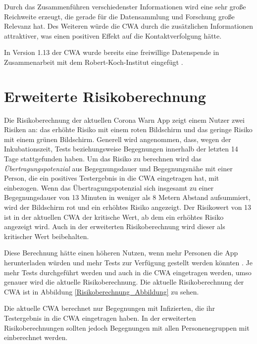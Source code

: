 \documentclass[conference,compsoc]{IEEEtran}
\begin{document}
Durch das Zusammenführen verschiedenster Informationen wird eine sehr große Reichweite erzeugt, die gerade für die Datensammlung und Forschung große Relevanz hat.
Des Weiteren würde die CWA durch die zusätzlichen Informationen attraktiver, was einen positiven Effekt auf die Kontaktverfolgung hätte.

In Version 1.13 der CWA wurde bereits eine freiwillige Datenspende in Zusammenarbeit mit dem Robert-Koch-Institut eingefügt \cite{freiwilligeDatenspende}. 

\section{Erweiterte Risikoberechnung} \label{Erweiterte_Risikoberechnung}

Die Risikoberechnung der aktuellen Corona Warn App zeigt einem Nutzer zwei Risiken an: 
das erhöhte Risiko mit einem roten Bildschirm und das geringe Risiko mit einem grünen Bildschirm. 
Generell wird angenommen, dass, wegen der Inkubationszeit, Tests beziehungsweise Begegnungen innerhalb der letzten 14 Tage stattgefunden haben.
Um das Risiko zu berechnen wird das \textit{Übertragungspotenzial} aus Begegnungsdauer und Begegnungsnähe mit einer Person, 
die ein positives Testergebnis in die CWA eingetragen hat, mit einbezogen. 
Wenn das Übertragungspotenzial sich insgesamt zu einer Begegnungsdauer von 13 Minuten in weniger als 8 Metern Abstand aufsummiert, 
wird der Bildschirm rot und ein erhöhtes Risiko angezeigt.
Der Risikowert von 13 ist in der aktuellen CWA der kritische Wert, ab dem ein erhöhtes Risiko angezeigt wird.
Auch in der erweiterten Risikoberechnung wird dieser als kritischer Wert beibehalten.

Diese Berechnung hätte einen höheren Nutzen, wenn mehr Personen die App herunterladen würden und mehr Tests zur Verfügung gestellt werden könnten \cite{EffectivenessCWA}.
Je mehr Tests durchgeführt werden und auch in die CWA eingetragen werden, umso genauer wird die aktuelle Risikoberechnung. 
Die aktuelle Risikoberechnung der CWA ist in Abbildung \ref{Risikoberechnung_Abbildung} zu sehen.


Die aktuelle CWA berechnet nur Begegnungen mit Infizierten, die ihr Testergebnis in die CWA eingetragen haben.
In der erweiterten Risikoberechnungen sollten jedoch Begegnungen mit allen Personenegruppen mit einberechnet werden.
\end{document}
